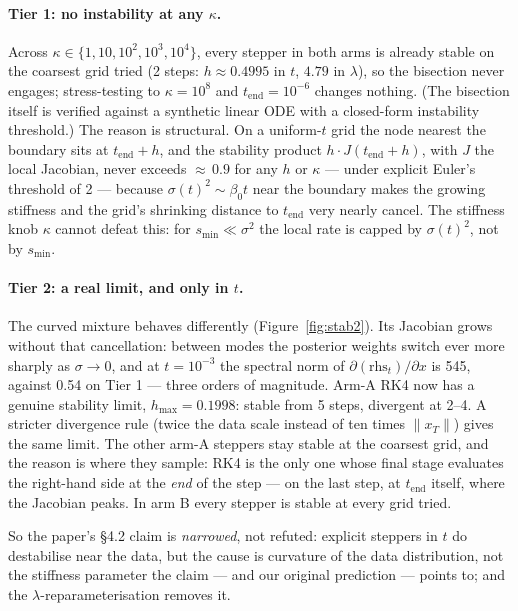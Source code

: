 \documentclass[11pt,a4paper]{article}
\newcommand{\lam}{\lambda}
\begin{document}
\paragraph{Tier 1: no instability at any $\kappa$.} Across
$\kappa\in\{1,10,10^2,10^3,10^4\}$, every stepper in both arms is already stable on
the coarsest grid tried (2 steps: $h \approx 0.4995$ in $t$, $4.79$ in $\lam$), so
the bisection never engages; stress-testing to $\kappa = 10^{8}$ and
$t_{\text{end}} = 10^{-6}$ changes nothing. (The bisection itself is verified
against a synthetic linear ODE with a closed-form instability threshold.) The
reason is structural. On a uniform-$t$ grid the node nearest the boundary sits at
$t_{\text{end}}+h$, and the stability product $h\cdot J(t_{\text{end}}+h)$, with $J$
the local Jacobian, never exceeds ${\approx}\,0.9$ for any $h$ or $\kappa$ ---
under explicit Euler's threshold of 2 --- because $\sigma(t)^2 \sim \beta_0 t$ near
the boundary makes the growing stiffness and the grid's shrinking distance to
$t_{\text{end}}$ very nearly cancel. The stiffness knob $\kappa$ cannot defeat this:
for $s_{\min}\ll\sigma^2$ the local rate is capped by $\sigma(t)^2$, not by
$s_{\min}$.

\paragraph{Tier 2: a real limit, and only in $t$.} The curved mixture behaves
differently (Figure~\ref{fig:stab2}). Its Jacobian grows without that cancellation:
between modes the posterior weights switch ever more sharply as $\sigma\to0$, and
at $t = 10^{-3}$ the spectral norm of $\partial(\text{rhs}_t)/\partial x$ is 545,
against 0.54 on Tier 1 --- three orders of magnitude. Arm-A RK4 now has a genuine
stability limit, $h_{\max} = 0.1998$: stable from 5 steps, divergent at 2--4. A
stricter divergence rule (twice the data scale instead of ten times
$\lVert x_T\rVert$) gives the same limit. The other arm-A steppers stay stable at the
coarsest grid, and the reason is where they sample: RK4 is the only one whose
final stage evaluates the right-hand side at the \emph{end} of the step --- on the
last step, at $t_{\text{end}}$ itself, where the Jacobian peaks. In arm B every
stepper is stable at every grid tried.

So the paper's \S4.2 claim is \emph{narrowed}, not refuted: explicit steppers in
$t$ do destabilise near the data, but the cause is curvature of the data
distribution, not the stiffness parameter the claim --- and our original
prediction --- points to; and the $\lam$-reparameterisation removes it.
\end{document}
